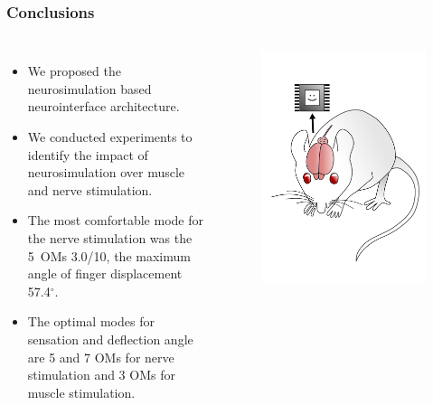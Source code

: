\documentclass[12pt, aspectratio=169]{beamer}
\begin{document}
\begin{frame}
  \frametitle{Conclusions}
\begin{columns}[c]
 
\begin{itemize}
  \item We proposed the neurosimulation based neurointerface architecture.
  \item We conducted experiments to identify the impact of neurosimulation over muscle and nerve stimulation.
  \item The most comfortable mode for the nerve stimulation was the 5~OMs 3.0/10, the maximum angle of finger displacement 57.4$^{\circ}$.
  \item The optimal modes for sensation and deflection angle are 5 and 7 OMs for nerve stimulation and 3 OMs for muscle stimulation.
\end{itemize}

\begin{figure}
\includegraphics[width=1.0\linewidth]{mousebrainpink}
\end{figure}
\end{columns}
\end{frame}
\end{document}
